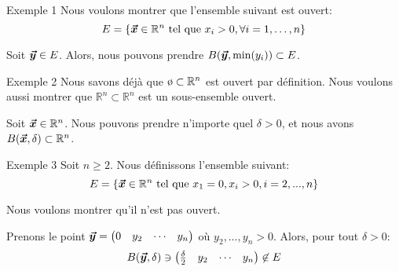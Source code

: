 \documentclass[a4paper]{article}
\begin{document}
\begin{parag}{Exemple 1}
    Nous voulons montrer que l'ensemble suivant est ouvert:
    \[E = \left\{\bvec{x} \in\mathbb{R}^n \telque x_i > 0, \forall i = 1, \ldots, n\right\}\]

    Soit $\bm{\protect\vec{y}} \in E$. Alors, nous pouvons prendre $B\left(\bvec{y}, \min\left(y_i\right)\right) \subset E$. 

\end{parag}

\begin{parag}{Exemple 2}
    Nous savons déjà que $\o \subset \mathbb{R}^n$ est ouvert par définition. Nous voulons aussi montrer que $\mathbb{R}^n \subset\mathbb{R}^n$ est un sous-ensemble ouvert.

    Soit $\bm{\protect\vec{x}} \in \mathbb{R}^n$. Nous pouvons prendre n'importe quel $\delta > 0$, et nous avons $B\left(\bvec{x}, \delta\right) \subset\mathbb{R}^n$.
\end{parag}

\begin{parag}{Exemple 3}
    Soit $n \geq 2$. Nous définissons l'ensemble suivant: 
    \[E = \left\{\bvec{x} \in \mathbb{R}^n \telque x_1 = 0, x_i > 0, i = 2, ..., n\right\}\]
    
    Nous voulons montrer qu'il n'est pas ouvert. 

    Prenons le point $\bm{\protect\vec{y}} = \begin{pmatrix} 0 & y_2 & \cdots & y_n \end{pmatrix} $ où $y_2, \ldots, y_n > 0$. Alors, pour tout $\delta > 0$:
    \[B\left(\bvec{y}, \delta\right) \ni \begin{pmatrix} \frac{\delta}{2} & y_2 & \cdots & y_n \end{pmatrix} \not\in E\]
\end{parag}
\end{document}
